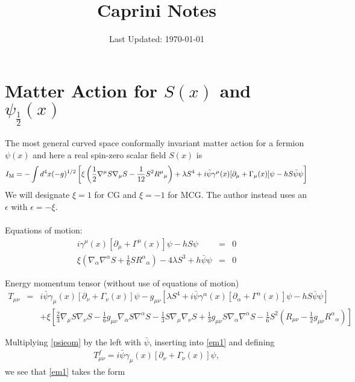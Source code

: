 \documentclass[10pt,letterpaper]{article}
\title{Caprini Notes}
\author{}
\date{Last Updated: \today}
\numberwithin{equation}{subsection}
\begin{document}
\maketitle
\tableofcontents
\newpage
\section{Matter Action for $S(x)$ and $\psi_{\frac12}(x)$}

The most general curved space conformally invariant matter action for a fermion $\psi(x)$ and here a real spin-zero scalar field $S(x)$ is
\begin{eqnarray}
	I_{\rm M} = -\int d^4x(-g)^{1/2} \left[ \xi \left(\frac12 \nabla^\mu S \nabla_\mu S - \frac{1}{12} S^2 R^{\mu}{}_{\mu}\right) + \lambda S^4 
+ i\bar\psi\gamma^\mu(x)[\partial_\mu + \Gamma_\mu(x)]\psi -hS\bar\psi\psi\right]
\label{matteraction}
\end{eqnarray}
We will designate $\xi = 1$ for CG and $\xi = -1$ for MCG. The author instead uses an $\epsilon$ with $\epsilon = -\xi$. 
\\ \\
Equations of motion:
\begin{eqnarray}
i\gamma^\mu(x)[\partial_\mu + \Gamma^\mu(x)]\psi - hS\psi &=& 0
\label{psieom}
\\
\xi \left( \nabla_\alpha\nabla^\alpha S + \frac16 S R^\alpha{}_\alpha \right) - 4\lambda S^3 + h\bar\psi\psi &=& 0
\label{seom}
\end{eqnarray}

Energy momentum tensor (without use of equations of motion)
\begin{eqnarray}
T_{\mu\nu} &=& i\bar \psi \gamma_\mu(x)[\partial_\nu +\Gamma_\nu(x)]\psi 
- g_{\mu\nu}\left[ \lambda S^4 + i\bar\psi\gamma^\alpha(x)[\partial_\alpha + \Gamma^\alpha(x)]\psi - hS\bar\psi \psi\right]
\nonumber\\
&&
+\xi \left[ \frac23 \nabla_\mu S\nabla_\nu S - \frac 16 g_{\mu\nu} \nabla_\alpha S\nabla^\alpha S 
- \frac13 S\nabla_\mu\nabla_\nu S + \frac13 g_{\mu\nu} S \nabla_\alpha\nabla^\alpha S  
- \frac16 S^2\left( R_{\mu\nu} - \frac12 g_{\mu\nu} R^\alpha{}_\alpha\right)\right] 
\label{em1}
\end{eqnarray}

Multiplying \eqref{psieom} by the left with $\bar\psi$, inserting into \eqref{em1} and defining
\begin{eqnarray}
T_{\mu\nu}^f = i\bar \psi \gamma_\mu(x)[\partial_\nu +\Gamma_\nu(x)]\psi ,
\end{eqnarray}
we see that \eqref{em1} takes the form
\end{document}
